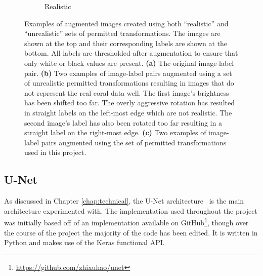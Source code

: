 \begin{figure}[t]
\begin{subfigure}[t]{0.38\textwidth}
        \caption{Realistic}
    \end{subfigure}
    \caption{Examples of augmented images created using both ``realistic'' and ``unrealistic'' sets of permitted transformations. The images are shown at the top and their corresponding labels are shown at the bottom. All labels are thresholded after augmentation to ensure that only white or black values are present. \textbf{(a)} The original image-label pair. \textbf{(b)} Two examples of image-label pairs augmented using a set of unrealistic permitted transformations resulting in images that do not represent the real coral data well. The first image's brightness has been shifted too far. The overly aggressive rotation has resulted in straight labels on the left-most edge which are not realistic. The second image's label has also been rotated too far resulting in a straight label on the right-most edge. \textbf{(c)} Two examples of image-label pairs augmented using the set of permitted transformations used in this project.}
    \label{fig:augexample}
\end{figure}

\subsection{U-Net}

As discussed in Chapter \ref{chap:technical}, the U-Net architecture~\cite{ronneberger2015u} is the main architecture experimented with. The implementation used throughout the project was initially based off of an implementation available on GitHub\footnote{\url{https://github.com/zhixuhao/unet}}, though over the course of the project the majority of the code has been edited. It is written in Python and makes use of the Keras functional API.

